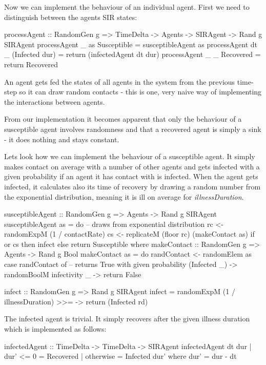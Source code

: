 Now we can implement the behaviour of an individual agent. First we need to distinguish between the agents SIR states:

\begin{HaskellCode}
processAgent :: RandomGen g 
  => TimeDelta -> Agents -> SIRAgent -> Rand g SIRAgent
processAgent _  as Susceptible    = susceptibleAgent as
processAgent dt _  (Infected dur) = return (infectedAgent dt dur)
processAgent _  _  Recovered      = return Recovered
\end{HaskellCode}

An agent gets fed the states of all agents in the system from the previous time-step so it can draw random contacts - this is one, very naive way of implementing the interactions between agents.

From our implementation it becomes apparent that only the behaviour of a susceptible agent involves randomness and that a recovered agent is simply a sink - it does nothing and stays constant.

Lets look how we can implement the behaviour of a susceptible agent. It simply makes contact on average with a number of other agents and gets infected with a given probability if an agent it has contact with is infected.
When the agent gets infected, it calculates also its time of recovery by drawing a random number from the exponential distribution, meaning it is ill on average for \textit{illnessDuration}.

\begin{HaskellCode}
susceptibleAgent :: RandomGen g => Agents -> Rand g SIRAgent
susceptibleAgent as = do
    -- draws from exponential distribution
    rc <- randomExpM (1 / contactRate) 
    cs <- replicateM (floor rc) (makeContact as)
    if or cs
      then infect
      else return Susceptible
  where
    makeContact :: RandomGen g => Agents -> Rand g Bool
    makeContact as = do
      randContact <- randomElem as
      case randContact of
        -- returns True with given probability 
        (Infected _) -> randomBoolM infectivity 
        _            -> return False

    infect :: RandomGen g => Rand g SIRAgent
    infect = randomExpM (1 / illnessDuration) 
               >>= \rd -> return (Infected rd)
\end{HaskellCode}

The infected agent is trivial. It simply recovers after the given illness duration which is implemented as follows:

\begin{HaskellCode}
infectedAgent :: TimeDelta -> TimeDelta -> SIRAgent
infectedAgent dt dur
    | dur' <= 0 = Recovered
    | otherwise = Infected dur'
  where
    dur' = dur - dt  
\end{HaskellCode}

